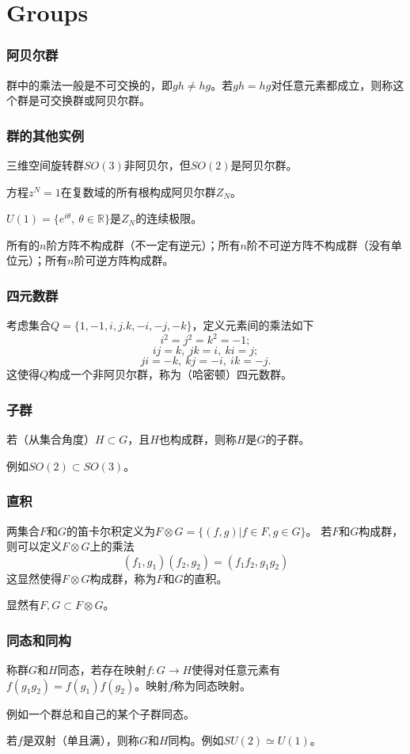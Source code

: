 \documentclass[CJK]{beamer}
\newcommand{\reals}{\mathbb{R}}
\begin{document}
\section{Groups}
\begin{frame}
\frametitle{\bch 阿贝尔群 \ech}
\bch
群中的乘法一般是不可交换的，即$gh \not= hg$。若$gh = hg$对任意元素都成立，则称这个群是可交换群或阿贝尔群。

\ech
\end{frame}

\begin{frame}
\frametitle{\bch 群的其他实例 \ech}
\bch
三维空间旋转群$SO(3)$非阿贝尔，但$SO(2)$是阿贝尔群。
\par
方程$z^N = 1$在复数域的所有根构成阿贝尔群$Z_N$。
\par
$U(1) = \{ e^{i \theta},\ \theta \in \reals\}$是$Z_N$的连续极限。
\par
所有的$n$阶方阵不构成群（不一定有逆元）；所有$n$阶不可逆方阵不构成群（没有单位元）；所有$n$阶可逆方阵构成群。

\ech
\end{frame}

\begin{frame}
\frametitle{\bch 四元数群 \ech}
\bch
考虑集合$Q = \{ 1,-1,i,j.k,-i,-j,-k\}$，定义元素间的乘法如下
$$ i^2 = j^2 = k^2 = -1;$$
$$ ij = k,\ jk = i,\ ki = j;$$
$$ji = -k,\ kj = -i,\ ik = -j.$$
这使得$Q$构成一个非阿贝尔群，称为（哈密顿）四元数群。

\ech
\end{frame}


\begin{frame}
\frametitle{\bch 子群 \ech}
\bch
若（从集合角度）$H\subset G$，且$H$也构成群，则称$H$是$G$的子群。\par
例如$SO(2) \subset SO(3)$。


\ech
\end{frame}

\begin{frame}
\frametitle{\bch 直积 \ech}
\bch
两集合$F$和$G$的笛卡尔积定义为$F\otimes G = \{ (f,g) | f\in F, g \in G\}$。
若$F$和$G$构成群，则可以定义$F\otimes G$上的乘法
$$ (f_1,g_1) (f_2,g_2) = (f_1 f_2,g_1g_2)$$
这显然使得$F\otimes G$构成群，称为$F$和$G$的直积。
\par
显然有$F,G \subset F \otimes G$。


\ech
\end{frame}

\begin{frame}
\frametitle{\bch 同态和同构 \ech}
\bch
称群$G$和$H$同态，若存在映射$f: G \to H$使得对任意元素有$f(g_1 g_2) = f(g_1) f(g_2)$。映射$f$称为同态映射。
\par
例如一个群总和自己的某个子群同态。
\par
若$f$是双射（单且满），则称$G$和$H$同构。例如$SU(2) \simeq U(1)$。


\ech
\end{frame}
\end{document}
